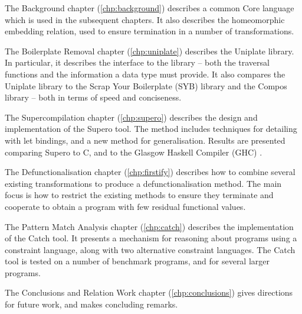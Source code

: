 The Background chapter (\ref{chp:background}) describes a common Core language which is used in the subsequent chapters. It also describes the homeomorphic embedding relation, used to ensure termination in a number of transformations.

The Boilerplate Removal chapter (\ref{chp:uniplate}) describes the Uniplate library. In particular, it describes the interface to the library -- both the traversal functions and the information a data type must provide. It also compares the Uniplate library to the Scrap Your Boilerplate (SYB) library \cite{lammel:syb} and the Compos library \cite{bringert:compos} -- both in terms of speed and conciseness.

The Supercompilation chapter (\ref{chp:supero}) describes the design and implementation of the Supero tool. The method includes techniques for detailing with let bindings, and a new method for generalisation. Results are presented comparing Supero to C, and to the Glasgow Haskell Compiler (GHC) \cite{ghc}.

The Defunctionalisation chapter (\ref{chp:firstify}) describes how to combine several existing transformations to produce a defunctionalisation method. The main focus is how to restrict the existing methods to ensure they terminate and cooperate to obtain a program with few residual functional values.

The Pattern Match Analysis chapter (\ref{chp:catch}) describes the implementation of the Catch tool. It presents a mechanism for reasoning about programs using a constraint language, along with two alternative constraint languages. The Catch tool is tested on a number of benchmark programs, and for several larger programs.

The Conclusions and Relation Work chapter (\ref{chp:conclusions}) gives directions for future work, and makes concluding remarks.

